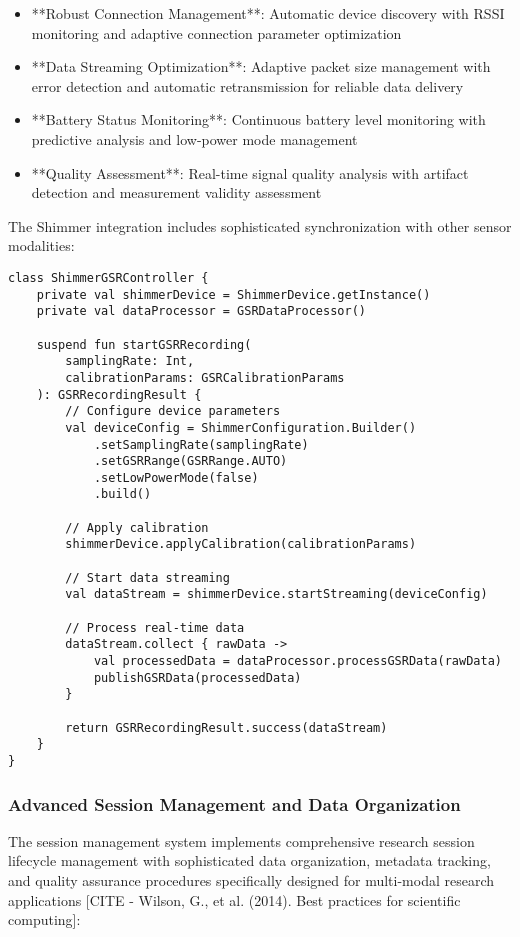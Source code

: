 \documentclass[12pt,a4paper]{report}
\begin{document}
\begin{itemize}
\item **Robust Connection Management**: Automatic device discovery with RSSI monitoring and adaptive connection parameter
  optimization
\item **Data Streaming Optimization**: Adaptive packet size management with error detection and automatic retransmission for
  reliable data delivery
\item **Battery Status Monitoring**: Continuous battery level monitoring with predictive analysis and low-power mode
  management
\item **Quality Assessment**: Real-time signal quality analysis with artifact detection and measurement validity assessment

\end{itemize}
The Shimmer integration includes sophisticated synchronization with other sensor modalities:

\begin{verbatim}
class ShimmerGSRController {
    private val shimmerDevice = ShimmerDevice.getInstance()
    private val dataProcessor = GSRDataProcessor()

    suspend fun startGSRRecording(
        samplingRate: Int,
        calibrationParams: GSRCalibrationParams
    ): GSRRecordingResult {
        // Configure device parameters
        val deviceConfig = ShimmerConfiguration.Builder()
            .setSamplingRate(samplingRate)
            .setGSRRange(GSRRange.AUTO)
            .setLowPowerMode(false)
            .build()

        // Apply calibration
        shimmerDevice.applyCalibration(calibrationParams)

        // Start data streaming
        val dataStream = shimmerDevice.startStreaming(deviceConfig)

        // Process real-time data
        dataStream.collect { rawData ->
            val processedData = dataProcessor.processGSRData(rawData)
            publishGSRData(processedData)
        }

        return GSRRecordingResult.success(dataStream)
    }
}
\end{verbatim}

\subsubsection{Advanced Session Management and Data Organization}

The session management system implements comprehensive research session lifecycle management with sophisticated data
organization, metadata tracking, and quality assurance procedures specifically designed for multi-modal research
applications [CITE - Wilson, G., et al. (2014). Best practices for scientific computing]:
\end{document}

